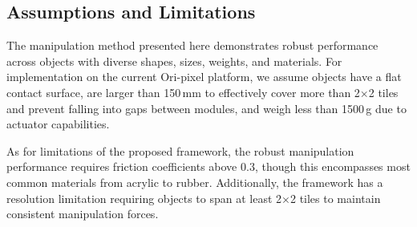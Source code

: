 \subsection{Assumptions and Limitations}
\label{sec:sim_to_real}
The manipulation method presented here demonstrates robust performance across objects with diverse shapes, sizes, weights, and materials. For implementation on the current Ori-pixel platform, we assume objects have a flat contact surface, are larger than 150\,mm to effectively cover more than 2$\times$2 tiles and prevent falling into gaps between modules, and weigh less than 1500\,g due to actuator capabilities. 

As for limitations of the proposed framework, the robust manipulation performance requires friction coefficients above 0.3, though this encompasses most common materials from acrylic to rubber. Additionally, the framework has a resolution limitation requiring objects to span at least 2$\times$2 tiles to maintain consistent manipulation forces.